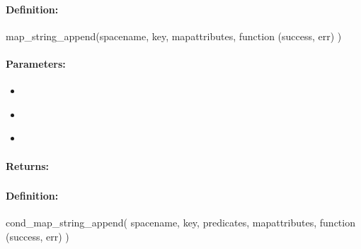 \paragraph{Definition:}
\begin{javascriptcode}
map_string_append(spacename, key, mapattributes, function (success, err) {})
\end{javascriptcode}
\paragraph{Parameters:}
\begin{itemize}[noitemsep]
\item {}\\

\item {}\\

\item {}\\

\end{itemize}

\paragraph{Returns:}


\pagebreak
\subsubsection{}
\label{api:nodejs:cond_map_string_append}


\paragraph{Definition:}
\begin{javascriptcode}
cond_map_string_append(
        spacename, key, predicates, mapattributes, function (success, err) {})
\end{javascriptcode}

